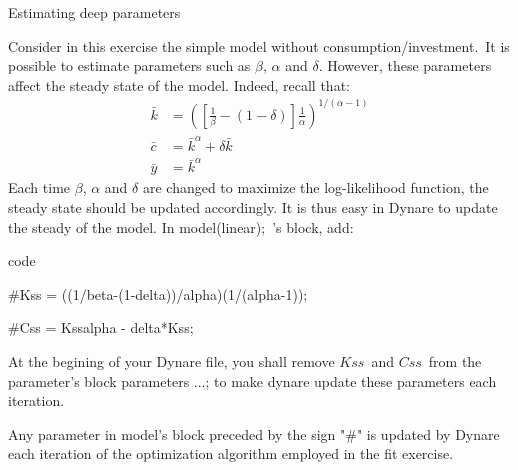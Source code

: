 \documentclass[a4paper,12pt]{article}%
\begin{document}
\begin{myexercise}{Estimating deep parameters}
%


Consider in this exercise the simple model without consumption/investment.\ It
is possible to estimate parameters such as $\beta$, $\alpha$ and $\delta$.
However, these parameters affect the steady state of the model. Indeed, recall
that:%
\begin{align*}
\bar{k}  &  =\left(  \left[  \frac{1}{\beta}-\left(  1-\delta\right)  \right]
\frac{1}{\alpha}\right)  ^{1/\left(  \alpha-1\right)  }\\
\bar{c}  &  =\bar{k}^{\alpha}+\delta\bar{k}\\
\bar{y}  &  =\bar{k}^{\alpha}%
\end{align*}
Each time $\beta$, $\alpha$ and $\delta$ are changed to maximize the
log-likelihood function, the steady state should be updated accordingly. It is
thus easy in Dynare to update the steady of the model. In\textsf{
model(linear);}\ 's block, add:%

\vspace{3ex}
\begin{mybox}{code}%


\textsf{\#Kss = ((1/beta-(1-delta))/alpha)(1/(alpha-1));}

\textsf{\#Css = Kssalpha - delta*Kss;}%

\end{mybox}
\vspace{3ex}%


At the begining of your Dynare file, you shall remove $Kss$\ and $Css$\ from
the parameter's block \textsf{parameters ...;} to make dynare update these
parameters each iteration.

Any parameter in model's block preceded by the sign "\textsf{\#}" is updated
by Dynare each iteration of the optimization algorithm employed in the fit exercise.


\end{myexercise}
\end{document}
